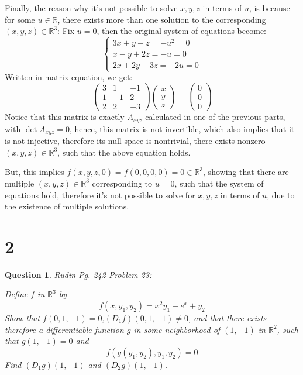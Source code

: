 \documentclass{article}
\newtheorem{question}{Question}
\begin{document}
Finally, the reason why it's not possible to solve $x,y,z$ in terms of $u$, is because for some $u\in\mathbb{R}$, there exists more than one solution to the corresponding $(x,y,z)\in\mathbb{R}^3$: Fix $u=0$, then the original system of equations become:
$$\begin{cases}
    3x+y-z = -u^2=0\\
    x-y+2z=-u=0\\
    2x+2y-3z = -2u = 0
\end{cases}$$
Written in matrix equation, we get:
$$\begin{pmatrix}
    3&1&-1\\
    1&-1&2\\
    2&2&-3
\end{pmatrix}\begin{pmatrix}
    x\\y\\z
\end{pmatrix}=\begin{pmatrix}
    0\\0\\0
\end{pmatrix}$$
Notice that this matrix is exactly $A_{xyz}$ calculated in one of the previous parts, with $\det A_{xyz}=0$, hence, this matrix is not invertible, which also implies that it is not injective, therefore its null space is nontrivial, there exists nonzero $(x,y,z)\in\mathbb{R}^3$, such that the above equation holds.

But, this implies $f(x,y,z,0)=f(0,0,0,0)=\bar{0}\in\mathbb{R}^3$, showing that there are multiple $(x,y,z)\in\mathbb{R}^3$ corresponding to $u=0$, such that the system of equations hold, therefore it's not possible to solve for $x,y,z$ in terms of $u$, due to the existence of multiple solutions.

\break

\section*{2}
\begin{myBox}[]{}
    \begin{question}
        Rudin Pg. 242 Problem 23:

        Define $f$ in $\mathbb{R}^3$ by
        $$f(x,y_1,y_2)=x^2y_1+e^x+y_2$$
        Show that $f(0,1,-1)=0$,$(D_1f)(0,1,-1)\neq 0$, and that there exists therefore a differentiable function $g$ in some neighborhood of $(1,-1)$ in $\mathbb{R}^2$,
        such that $g(1,-1)=0$ and 
        $$f(g(y_1,y_2),y_1,y_2)=0$$
        Find $(D_1g)(1,-1)$ and $(D_2g)(1,-1)$.
    \end{question}
\end{myBox}
\end{document}
